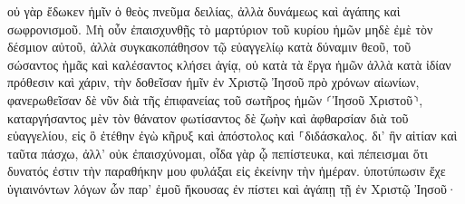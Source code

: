\documentclass{openreader}
\begin{document}
οὐ γὰρ ἔδωκεν ἡμῖν ὁ θεὸς πνεῦμα δειλίας, ἀλλὰ δυνάμεως καὶ ἀγάπης καὶ σωφρονισμοῦ. 
Μὴ οὖν ἐπαισχυνθῇς τὸ μαρτύριον τοῦ κυρίου ἡμῶν μηδὲ ἐμὲ τὸν δέσμιον αὐτοῦ, ἀλλὰ συγκακοπάθησον τῷ εὐαγγελίῳ κατὰ δύναμιν θεοῦ, 
τοῦ σώσαντος ἡμᾶς καὶ καλέσαντος κλήσει ἁγίᾳ, οὐ κατὰ τὰ ἔργα ἡμῶν ἀλλὰ κατὰ ἰδίαν πρόθεσιν καὶ χάριν, τὴν δοθεῖσαν ἡμῖν ἐν Χριστῷ Ἰησοῦ πρὸ χρόνων αἰωνίων, 
φανερωθεῖσαν δὲ νῦν διὰ τῆς ἐπιφανείας τοῦ σωτῆρος ἡμῶν ⸂Ἰησοῦ Χριστοῦ⸃, καταργήσαντος μὲν τὸν θάνατον φωτίσαντος δὲ ζωὴν καὶ ἀφθαρσίαν διὰ τοῦ εὐαγγελίου, 
εἰς ὃ ἐτέθην ἐγὼ κῆρυξ καὶ ἀπόστολος καὶ ⸀διδάσκαλος. 
δι’ ἣν αἰτίαν καὶ ταῦτα πάσχω, ἀλλ’ οὐκ ἐπαισχύνομαι, οἶδα γὰρ ᾧ πεπίστευκα, καὶ πέπεισμαι ὅτι δυνατός ἐστιν τὴν παραθήκην μου φυλάξαι εἰς ἐκείνην τὴν ἡμέραν. 
ὑποτύπωσιν ἔχε ὑγιαινόντων λόγων ὧν παρ’ ἐμοῦ ἤκουσας ἐν πίστει καὶ ἀγάπῃ τῇ ἐν Χριστῷ Ἰησοῦ· 
\end{document}
